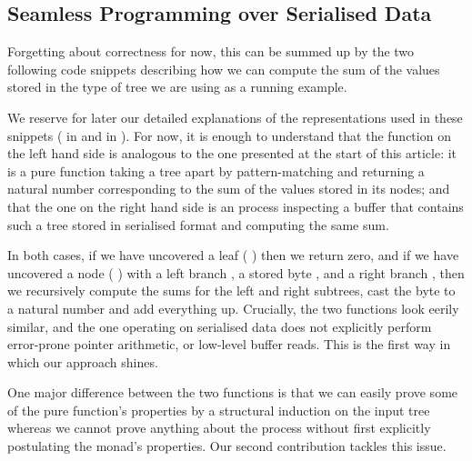 \subsection{Seamless Programming over Serialised Data}\label{sec:seamless}

Forgetting about correctness for now, this can be summed up by the
two following code snippets describing how we can compute the sum
of the values stored in the type of tree we are using as a running
example.

\noindent
\begin{minipage}{.4\textwidth}
\end{minipage}
\hfill\begin{minipage}{.55\textwidth}
\end{minipage}

We reserve for later our detailed explanations of the representations
used in these snippets
( in  and
 in ).
%
For now, it is enough to understand that the function on the left hand
side is analogous to the one presented at the start of this article: it
is a pure function taking a tree apart by pattern-matching and returning
a natural number corresponding to the sum of the values stored in its nodes;
%
and that the one on the right hand side is an  process
inspecting a buffer that contains such a tree stored in serialised format
and computing the same sum.

In both cases, if we have uncovered a leaf
({ \IdrisData{\#}} \IdrisKeyword{\KatlaUnderscore{}})
then we return zero,
and if we have uncovered a node
({ \IdrisData{\#}}  \IdrisData{\#}  \IdrisData{\#} )
with
a left branch ,
a stored byte ,
and a right branch ,
then we recursively compute the sums for the left and right subtrees,
cast the byte to a natural number and add everything up.
%
Crucially, the two functions look eerily similar, and the one operating on
serialised data does not explicitly perform error-prone pointer arithmetic,
or low-level buffer reads.
%
This is the first way in which our approach shines.

One major difference between the two functions is that
we can easily prove some of the pure function's properties by a structural
induction on the input tree whereas we
cannot prove anything about the  process without first
explicitly postulating the  monad's properties.
%
Our second contribution tackles this issue.

